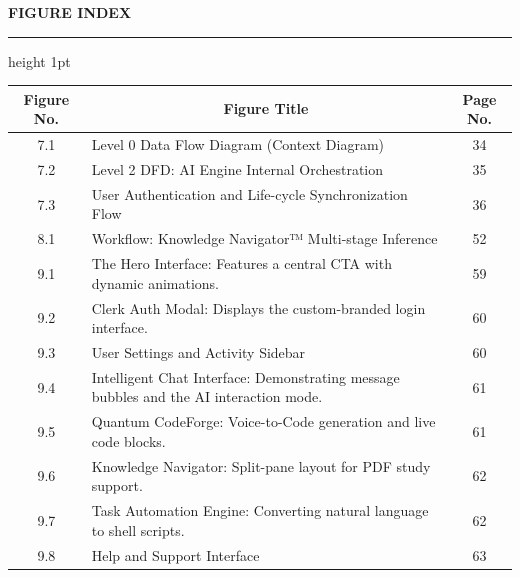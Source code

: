\begin{center}
{\LARGE\bfseries FIGURE INDEX}\\[0.3em]
\hrule height 1pt
\end{center}
\begin{center}
\renewcommand{\arraystretch}{1.0}
\begin{tabularx}{\textwidth}{|c|X|c|}
\hline
\textbf{Figure No.} & \multicolumn{1}{c|}{\textbf{Figure Title}} & \textbf{Page No.} \\ \hline
7.1 & Level 0 Data Flow Diagram (Context Diagram) & 34 \\ \hline
7.2 & Level 2 DFD: AI Engine Internal Orchestration & 35 \\ \hline
7.3 & User Authentication and Life-cycle Synchronization Flow & 36 \\ \hline
8.1 & Workflow: Knowledge Navigator™ Multi-stage Inference & 52 \\ \hline
9.1 & The Hero Interface: Features a central CTA with dynamic animations. & 59 \\ \hline
9.2 & Clerk Auth Modal: Displays the custom-branded login interface. & 60 \\ \hline
9.3 & User Settings and Activity Sidebar & 60 \\ \hline
9.4 & Intelligent Chat Interface: Demonstrating message bubbles and the AI interaction mode. & 61 \\ \hline
9.5 & Quantum CodeForge: Voice-to-Code generation and live code blocks. & 61 \\ \hline
9.6 & Knowledge Navigator: Split-pane layout for PDF study support. & 62 \\ \hline
9.7 & Task Automation Engine: Converting natural language to shell scripts. & 62 \\ \hline
9.8 & Help and Support Interface & 63 \\ \hline
\end{tabularx}
\end{center}
